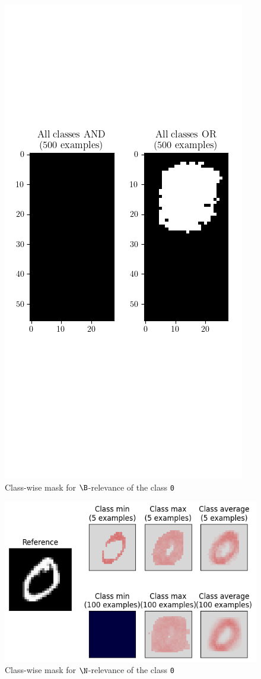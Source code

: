\documentclass{../cs-classes/cs-classes}
\newcommand*{\1}{\digitsbb{1}}
\newcommand*{\0}{\digitsbb{0}}
\begin{document}
\begin{figure}[H]
    \centering
    \includegraphics[width=.5\textwidth]{dmnist-all-classes.png}
    \caption{Class-wise mask for $\B$-relevance of the class \texttt{0}}
\end{figure}



\begin{figure}[H]
    \centering
    \includegraphics[width=.5\textwidth]{counting-mask.png}
    \caption{Class-wise mask for $\N$-relevance of the class \texttt{0}}
\end{figure}
\end{document}
